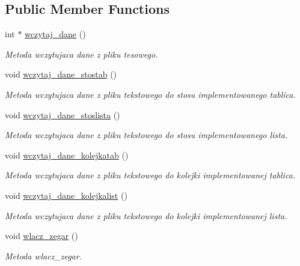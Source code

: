 \subsection*{Public Member Functions}
\begin{DoxyCompactItemize}
\item 
int $\ast$ \hyperlink{classalgorytm_aa2512ee12d0f4dd322b2ae38e0104728}{wczytaj\-\_\-dane} ()
\begin{DoxyCompactList}\small\item\em Metoda wczytujaca dane z pliku tesowego. \end{DoxyCompactList}\item 
void \hyperlink{classalgorytm_a6a50daab50bb9c7789103e480f8e2c0e}{wczytaj\-\_\-dane\-\_\-stostab} ()
\begin{DoxyCompactList}\small\item\em Metoda wczytujaca dane z pliku tekstowego do stosu implementowanego tablica. \end{DoxyCompactList}\item 
void \hyperlink{classalgorytm_af9ae4eedcaaa43665254cc40c3606f54}{wczytaj\-\_\-dane\-\_\-stoslista} ()
\begin{DoxyCompactList}\small\item\em Metoda wczytujaca dane z pliku tekstowego do stosu implementowanego lista. \end{DoxyCompactList}\item 
void \hyperlink{classalgorytm_a21851a809ea3ba6915d960c042fdba87}{wczytaj\-\_\-dane\-\_\-kolejkatab} ()
\begin{DoxyCompactList}\small\item\em Metoda wczytujaca dane z pliku tekstowego do kolejki implementowanej tablica. \end{DoxyCompactList}\item 
void \hyperlink{classalgorytm_a48d95d13b1f049c90a27cec0ef5e2c64}{wczytaj\-\_\-dane\-\_\-kolejkalist} ()
\begin{DoxyCompactList}\small\item\em Metoda wczytujaca dane z pliku tekstowego do kolejki implementowanej lista. \end{DoxyCompactList}\item 
void \hyperlink{classalgorytm_a5ace80a05bfc1305938d173753102ea2}{wlacz\-\_\-zegar} ()
\begin{DoxyCompactList}\small\item\em Metoda wlacz\-\_\-zegar. \end{DoxyCompactList}\item 

\end{DoxyCompactItemize}
